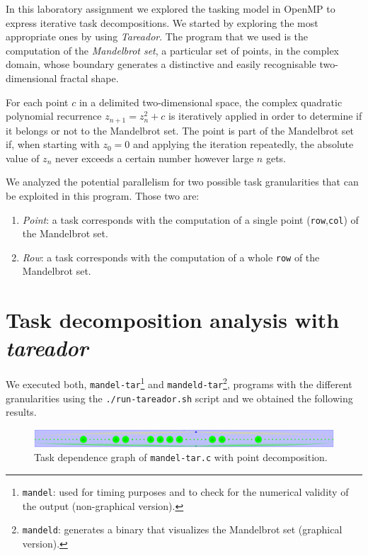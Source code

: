 In this laboratory assignment we explored the tasking model in OpenMP to express iterative task decompositions. 
We started by exploring the most appropriate ones by using \emph{Tareador}. The program that we used is the computation of the \emph{Mandelbrot set}, a particular set of points, in the complex domain, whose boundary generates a distinctive and easily recognisable two-dimensional fractal shape.

For each point $c$ in a delimited two-dimensional space, the complex quadratic polynomial recurrence $z_{n+1} = z^2_n + c$ is iteratively applied in order to determine if it belongs or not to the Mandelbrot set.  The point is part of the Mandelbrot set if, when starting with $z_0 = 0$ and applying the iteration repeatedly, the absolute value of $z_n$ never exceeds a certain number however large $n$ gets.

We analyzed the potential parallelism for two possible task granularities that can be exploited in this program. Those two are:
\begin{enumerate}[label=\alph*)]
\item \emph{Point}: a task corresponds with the computation of a single point (\texttt{row},\texttt{col}) of the Mandelbrot set.
\item \emph{Row}: a task corresponds with the computation of a whole \texttt{row} of the Mandelbrot set.
\end{enumerate}

\section{Task decomposition analysis with \emph{tareador}}%
\label{sec:tareador}

We executed both, \texttt{mandel-tar}\footnote{\texttt{mandel}: used for timing purposes and to check for the numerical validity of the output (non-graphical version).} and \texttt{mandeld-tar}\footnote{\texttt{mandeld}: generates a binary that visualizes the Mandelbrot set (graphical version).}, programs with the different granularities using the \texttt{./run-tareador.sh} script and we obtained the following results.

\begin{figure}[H]
\centering
\includegraphics[width=\textwidth]{plots/dependency_graph_mandel_point.png}
\caption{Task dependence graph of \texttt{mandel-tar.c} with point decomposition.}
\label{graph:mandel_point}
\end{figure}

